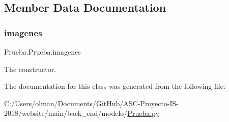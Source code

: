\subsection{Member Data Documentation}
\mbox{\label{class_prueba_1_1_prueba_af266bba2aecfbc1220e982cc10e3ac0a}} 
\subsubsection{\texorpdfstring{imagenes}{imagenes}}
{\footnotesize\ttfamily Prueba.\+Prueba.\+imagenes}



The constructor. 



The documentation for this class was generated from the following file\+:\begin{DoxyCompactItemize}
\item 
C\+:/\+Users/olman/\+Documents/\+Git\+Hub/\+A\+S\+C-\/\+Proyecto-\/\+I\+S-\/2018/website/main/back\+\_\+end/modelo/\mbox{\hyperlink{_prueba_8py}{Prueba.\+py}}\end{DoxyCompactItemize}
